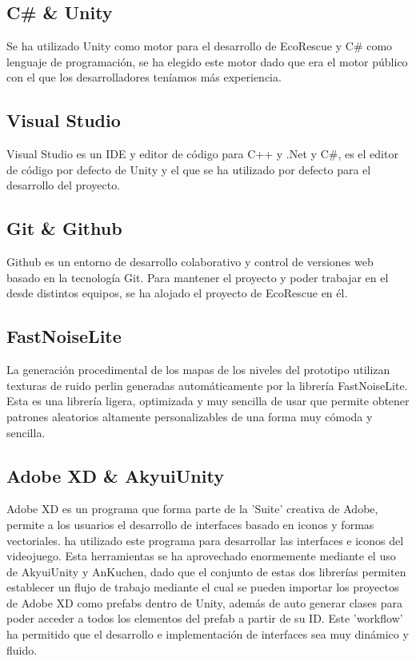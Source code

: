 \subsection{C\# \& Unity}

Se ha utilizado Unity\cite{unity} como motor para el desarrollo de EcoRescue y C\#\cite{csharp} como lenguaje de programación, se ha elegido este motor dado que era el motor público con el que los desarrolladores teníamos más experiencia.

\subsection{Visual Studio}

Visual Studio\cite{visualstudio} es un IDE y editor de código para C++ y .Net y C\#, es el editor de código por defecto de Unity y el que se ha utilizado por defecto para el desarrollo del proyecto. 

\subsection{Git \& Github}

Github\cite{github} es un entorno de desarrollo colaborativo y control de versiones web basado en la tecnología Git. Para mantener el proyecto y poder trabajar en el desde distintos equipos, se ha alojado el proyecto de EcoRescue\cite{Repo} en él.

\subsection{FastNoiseLite}

La generación procedimental de los mapas de los niveles del prototipo utilizan texturas de ruido perlin generadas automáticamente por la librería FastNoiseLite\cite{FastNoiseLite}. Esta es una librería ligera, optimizada y muy sencilla de usar que permite obtener patrones aleatorios altamente personalizables de una forma muy cómoda y sencilla.

\subsection{Adobe XD \& AkyuiUnity}

Adobe XD\cite{xd} es un programa que forma parte de la 'Suite' creativa de Adobe, permite a los usuarios el desarrollo de interfaces basado en iconos y formas vectoriales. \nombrecoautorespacio ha utilizado este programa para desarrollar las interfaces e iconos del videojuego. Esta herramientas se ha aprovechado enormemente mediante el uso de AkyuiUnity\cite{AkyuiUnity} y AnKuchen\cite{AnKuchen}, dado que el conjunto de estas dos librerías permiten establecer un flujo de trabajo mediante el cual se pueden importar los proyectos de Adobe XD como prefabs dentro de Unity, además de auto generar clases para poder acceder a todos los elementos del prefab a partir de su ID. Este 'workflow' ha permitido que el desarrollo e implementación de interfaces sea muy dinámico y fluido. 

